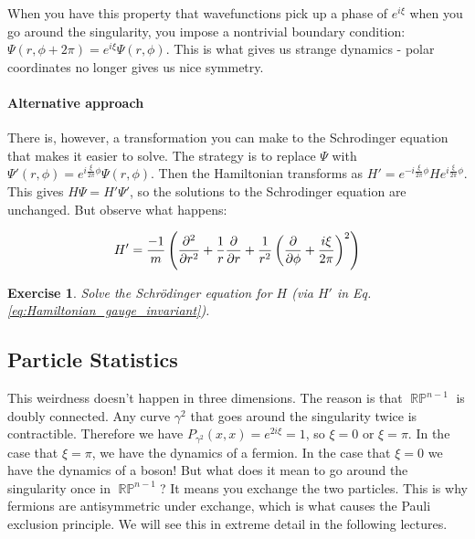 \documentclass{article}
\newtheorem{exercise}{Exercise}[section]
\DeclareMathOperator{\RP}{\mathbb{RP}}
\begin{document}
When you have this property that wavefunctions pick up a phase of $e^{i\xi}$ when you go around the singularity, you impose a nontrivial boundary condition: $\Psi(r,\phi+2\pi) = e^{i\xi}\Psi(r,\phi)$. This is what gives us strange dynamics - polar coordinates no longer gives us nice symmetry. 

\paragraph*{Alternative approach}

There is, however, a transformation you can make to the Schrodinger equation that makes it easier to solve. The strategy is to replace $\Psi$ with $\Psi'(r,\phi) = e^{i\frac{\xi}{2\pi}\phi}\Psi(r,\phi)$. Then the Hamiltonian transforms as $H' = e^{-i\frac{\xi}{2\pi}\phi}H e^{i\frac{\xi}{2\pi}\phi}$. This gives $H\Psi = H'\Psi'$, so the solutions to the Schrodinger equation are unchanged. But observe what happens:

\begin{equation}
H' = \frac{-1}{m}\left(\pdv[2]{r}+\frac{1}{r}\pdv{r}+ \frac{1}{r^2}\left(\pdv{\phi}+\frac{i\xi}{2\pi}\right)^2\right)
\label{eq:Hamiltonian_gauge_invariant}
\end{equation}

\begin{exercise}
	Solve the Schr\"odinger equation for $ H $ (via $ H' $ in Eq. \eqref{eq:Hamiltonian_gauge_invariant}).
\end{exercise}

\subsection{Particle Statistics}

This weirdness doesn't happen in three dimensions. The reason is that $\RP^{n-1}$ is doubly connected. Any curve $\gamma^2$ that goes around the singularity twice is contractible. Therefore we have $P_{\gamma^2}(x,x) = e^{2i\xi}=1$, so $\xi = 0$ or $\xi = \pi$. In the case that $\xi = \pi$, we have the dynamics of a fermion. In the case that $\xi = 0$ we have the dynamics of a boson! But what does it mean to go around the singularity once in $\RP^{n-1}$? It means you exchange the two particles. This is why fermions are antisymmetric under exchange, which is what causes the Pauli exclusion principle. We will see this in extreme detail in the following lectures.
\end{document}
